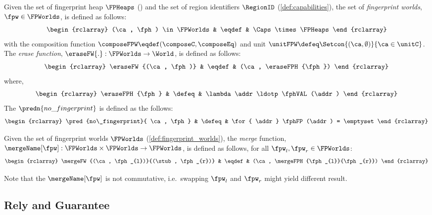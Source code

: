 \begin{definition}
\label{def:fingerprint_worlds}
Given the set of fingerprint heap $\FPHeaps$ () and the set of region identifiers $\RegionID$ (\ref{def:capabilities}), the set of \emph{fingerprint worlds}, $\fpw \in \FPWorlds$, is defined as follows:
\[
\begin{rclarray}
	(\ca, \fph) \in \FPWorlds  & \eqdef & \Caps \times \FPHeaps
\end{rclarray}
\]
with the composition function \( \composeFPW \eqdef (\composeC, \composeEq) \) and unit \( \unitFPW  \defeq \Setcon{(\ca, \emptyset)}{\ca \in \unitC }\).
The \emph{erase function}, $\eraseFW{.}: \FPWorlds \rightarrow \World$, is defined as follows:
\[
\begin{rclarray}
	\eraseFW{(\ca, \fph)} & \eqdef & (\ca, \eraseFPH{\fph})
\end{rclarray}
\]
where,
\[
\begin{rclarray}
	\eraseFPH{\fph} & \defeq & \lambda \addr \ldotp \fphVAL(\addr)
\end{rclarray}
\]
The \( \predn{no\_fingerprint} \) is defined as the follows:
\[
\begin{rclarray}
    \pred{no\_fingerprint}{ \ca, \fph } & \defeq & \for{ \addr } \fphFP(\addr) = \emptyset
\end{rclarray}
\]
\end{definition}

\begin{definition}
Given the set of fingerprint worlds $\FPWorlds$ (\ref{def:fingerprint_worlds}), the \emph{merge} function, $\mergeName[\fpw]: \FPWorlds \times \FPWorlds \rightarrow \FPWorlds$, is defined as follows, for all $\fpw_{l},\fpw_{r} \in \FPWorlds$:
\[
    \begin{rclarray}
	\mergeFW{(\ca, \fph_{l})}{(\stub, \fph_{r})} & \eqdef & (\ca, \mergeFPH{\fph_{l}}{\fph_{r}}) 
    \end{rclarray}
\]
\end{definition}

Note that the \( \mergeName[\fpw] \) is not commutative, i.e.\ swapping \( \fpw_{l}\) and \( \fpw_{r}\) might yield different result.

\subsection{Rely and Guarantee}

